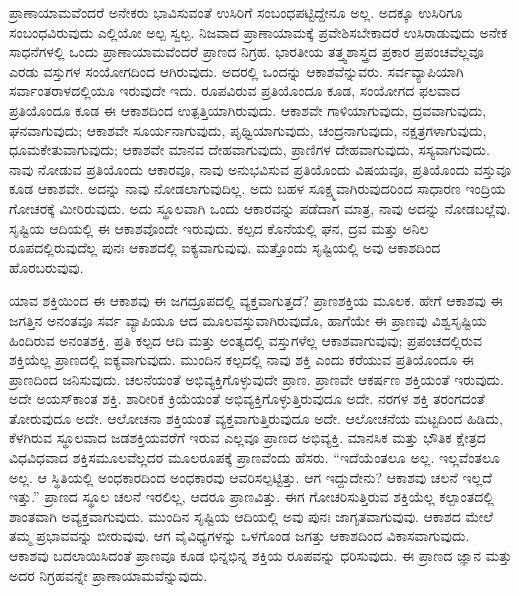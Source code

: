 ಪ್ರಾಣಾಯಾಮವೆಂದರೆ ಅನೇಕರು ಭಾವಿಸುವಂತೆ ಉಸಿರಿಗೆ ಸಂಬಂಧಪಟ್ಟಿದ್ದೇನೂ ಅಲ್ಲ. ಅದಕ್ಕೂ ಉಸಿರಿಗೂ ಸಂಬಂಧವಿರುವುದು ಎಲ್ಲಿಯೋ ಅಲ್ಪ ಸ್ವಲ್ಪ. ನಿಜವಾದ ಪ್ರಾಣಾಯಾಮಕ್ಕೆ ಪ್ರವೇಶಿಸಬೇಕಾದರೆ ಉಸಿರಾಡುವುದು ಅನೇಕ ಸಾಧನೆಗಳಲ್ಲಿ ಒಂದು ಪ್ರಾಣಾಯಾಮವೆಂದರೆ ಪ್ರಾಣದ ನಿಗ್ರಹ. ಭಾರತೀಯ ತತ್ತ್ವಶಾಸ್ತ್ರದ ಪ್ರಕಾರ ಪ್ರಪಂಚವೆಲ್ಲವೂ ಎರಡು ವಸ್ತುಗಳ ಸಂಯೋಗದಿಂದ ಆಗಿರುವುದು. ಅದರಲ್ಲಿ ಒಂದನ್ನು ಆಕಾಶವೆನ್ನುವರು. ಸರ್ವವ್ಯಾಪಿಯಾಗಿ ಸರ್ವಾಂತರಾಳದಲ್ಲಿಯೂ ಇರುವುದೇ ಇದು. ರೂಪವಿರುವ ಪ್ರತಿಯೊಂದೂ ಕೂಡ, ಸಂಯೋಗದ ಫಲವಾದ ಪ್ರತಿಯೊಂದೂ ಕೂಡ ಈ ಆಕಾಶದಿಂದ ಉತ್ಪತ್ತಿಯಾಗಿರುವುದು. ಆಕಾಶವೇ ಗಾಳಿಯಾಗುವುದು, ದ್ರವವಾಗುವುದು, ಘನವಾಗುವುದು; ಆಕಾಶವೇ ಸೂರ್ಯನಾಗುವುದು, ಪೃಥ್ವಿಯಾಗುವುದು, ಚಂದ್ರನಾಗುವುದು, ನಕ್ಷತ್ರಗಳಾಗುವುದು, ಧೂಮಕೇತುವಾಗುವುದು; ಆಕಾಶವೇ ಮಾನವ ದೇಹವಾಗುವುದು, ಪ್ರಾಣಿಗಳ ದೇಹವಾಗುವುದು, ಸಸ್ಯವಾಗುವುದು. ನಾವು ನೋಡುವ ಪ್ರತಿಯೊಂದು ಆಕಾರವೂ, ನಾವು ಅನುಭವಿಸುವ ಪ್ರತಿಯೊಂದು ವಿಷಯವೂ, ಪ್ರತಿಯೊಂದು ವಸ್ತುವೂ ಕೂಡ ಆಕಾಶವೇ. ಅದನ್ನು ನಾವು ನೋಡಲಾಗುವುದಿಲ್ಲ. ಅದು ಬಹಳ ಸೂಕ್ಷ್ಮವಾಗಿರುವುದರಿಂದ ಸಾಧಾರಣ ಇಂದ್ರಿಯ ಗೋಚರಕ್ಕೆ ಮೀರಿರುವುದು. ಅದು ಸ್ಥೂಲವಾಗಿ ಒಂದು ಆಕಾರವನ್ನು ಪಡೆದಾಗ ಮಾತ್ರ, ನಾವು ಅದನ್ನು ನೋಡಬಲ್ಲೆವು. ಸೃಷ್ಟಿಯ ಆದಿಯಲ್ಲಿ ಈ ಆಕಾಶವೊಂದೇ ಇರುವುದು. ಕಲ್ಪದ ಕೊನೆಯಲ್ಲಿ ಘನ, ದ್ರವ ಮತ್ತು ಅನಿಲ ರೂಪದಲ್ಲಿರುವುದೆಲ್ಲ ಪುನಃ ಆಕಾಶದಲ್ಲಿ ಐಕ್ಯವಾಗುವುವು. ಮತ್ತೊಂದು ಸೃಷ್ಟಿಯಲ್ಲಿ ಅವು ಆಕಾಶದಿಂದ ಹೊರಬರುವುವು. 

\vskip 0.2cm

ಯಾವ ಶಕ್ತಿಯಿಂದ ಈ ಆಕಾಶವು ಈ ಜಗದ್ರೂಪದಲ್ಲಿ ವ್ಯಕ್ತವಾಗುತ್ತದೆ? ಪ್ರಾಣಶಕ್ತಿಯ ಮೂಲಕ. ಹೇಗೆ ಆಕಾಶವು ಈ ಜಗತ್ತಿನ ಅನಂತವೂ ಸರ್ವ ವ್ಯಾಪಿಯೂ ಆದ ಮೂಲವಸ್ತುವಾಗಿರುವುದೊ, ಹಾಗೆಯೇ ಈ ಪ್ರಾಣವು ವಿಶ್ವಸೃಷ್ಟಿಯ ಹಿಂದಿರುವ ಅನಂತಶಕ್ತಿ. ಪ್ರತಿ ಕಲ್ಪದ ಆದಿ ಮತ್ತು ಅಂತ್ಯದಲ್ಲಿ ವಸ್ತುಗಳೆಲ್ಲ ಆಕಾಶವಾಗುವುವು; ಪ್ರಪಂಚದಲ್ಲಿರುವ ಶಕ್ತಿಯೆಲ್ಲ ಪ್ರಾಣದಲ್ಲಿ ಐಕ್ಯವಾಗುವುದು. ಮುಂದಿನ ಕಲ್ಪದಲ್ಲಿ ನಾವು ಶಕ್ತಿ ಎಂದು ಕರೆಯುವ ಪ್ರತಿಯೊಂದೂ ಈ ಪ್ರಾಣದಿಂದ ಜನಿಸುವುದು. ಚಲನೆಯಂತೆ ಅಭಿವ್ಯಕ್ತಿಗೊಳ್ಳುವುದೇ ಪ್ರಾಣ. ಪ್ರಾಣವೇ ಆಕರ್ಷಣ ಶಕ್ತಿಯಂತೆ ಇರುವುದು. ಅದೇ ಅಯಸ್​ಕಾಂತ ಶಕ್ತಿ. ಶಾರೀರಿಕ ಕ್ರಿಯೆಯಂತೆ ಅಭಿವ್ಯಕ್ತಿಗೊಳ್ಳುತ್ತಿರುವುದೂ ಅದೇ. ನರಗಳ ಶಕ್ತಿ ತರಂಗದಂತೆ ತೋರುವುದೂ ಅದೇ. ಆಲೋಚನಾ ಶಕ್ತಿಯಂತೆ ವ್ಯಕ್ತವಾಗುತ್ತಿರುವುದೂ ಅದೇ. ಆಲೋಚನೆಯ ಮಟ್ಟದಿಂದ ಹಿಡಿದು, ಕೆಳಗಿರುವ ಸ್ಥೂಲವಾದ ಜಡಶಕ್ತಿಯವರೆಗೆ ಇರುವ ಎಲ್ಲವೂ ಪ್ರಾಣದ ಅಭಿವ್ಯಕ್ತಿ. ಮಾನಸಿಕ ಮತ್ತು ಭೌತಿಕ ಕ್ಷೇತ್ರದ ವಿಧವಿಧವಾದ ಶಕ್ತಿಸಮೂಲವೆಲ್ಲದರ ಮೂಲರೂಪಕ್ಕೆ ಪ್ರಾಣವೆಂದು ಹೆಸರು. “ಇದೆಯೆಂತಲೂ ಅಲ್ಲ. ಇಲ್ಲವೆಂತಲೂ ಅಲ್ಲ. ಆ ಸ್ಥಿತಿಯಲ್ಲಿ ಅಂಧಕಾರದಿಂದ ಅಂಧಕಾರವು ಆವರಿಸಲ್ಪಟ್ಟಿತ್ತು. ಆಗ ಇದ್ದುದೇನು? ಆಕಾಶವು ಚಲನೆ ಇಲ್ಲದೆ ಇತ್ತು.” ಪ್ರಾಣದ ಸ್ಥೂಲ ಚಲನೆ ಇರಲಿಲ್ಲ, ಆದರೂ ಪ್ರಾಣವಿತ್ತು. ಈಗ ಗೋಚರಿಸುತ್ತಿರುವ ಶಕ್ತಿಯೆಲ್ಲ ಕಲ್ಪಾಂತದಲ್ಲಿ ಶಾಂತವಾಗಿ ಅವ್ಯಕ್ತವಾಗುವುದು. ಮುಂದಿನ ಸೃಷ್ಟಿಯ ಆದಿಯಲ್ಲಿ ಅವು ಪುನಃ ಜಾಗೃತವಾಗುವುವು. ಆಕಾಶದ ಮೇಲೆ ತಮ್ಮ ಪ್ರಭಾವವನ್ನು ಬೀರುವುವು. ಆಗ ವೈವಿಧ್ಯಗಳನ್ನು ಒಳಗೊಂಡ ಜಗತ್ತು ಆಕಾಶದಿಂದ ವಿಕಾಸವಾಗುವುದು. ಆಕಾಶವು ಬದಲಾಯಿಸಿದಂತೆ ಪ್ರಾಣವೂ ಕೂಡ ಭಿನ್ನಭಿನ್ನ ಶಕ್ತಿಯ ರೂಪವನ್ನು ಧರಿಸುವುದು. ಈ ಪ್ರಾಣದ ಜ್ಞಾನ ಮತ್ತು ಅದರ ನಿಗ್ರಹವನ್ನೇ ಪ್ರಾಣಾಯಾಮವೆನ್ನುವುದು. 

\vskip 0.2cm

